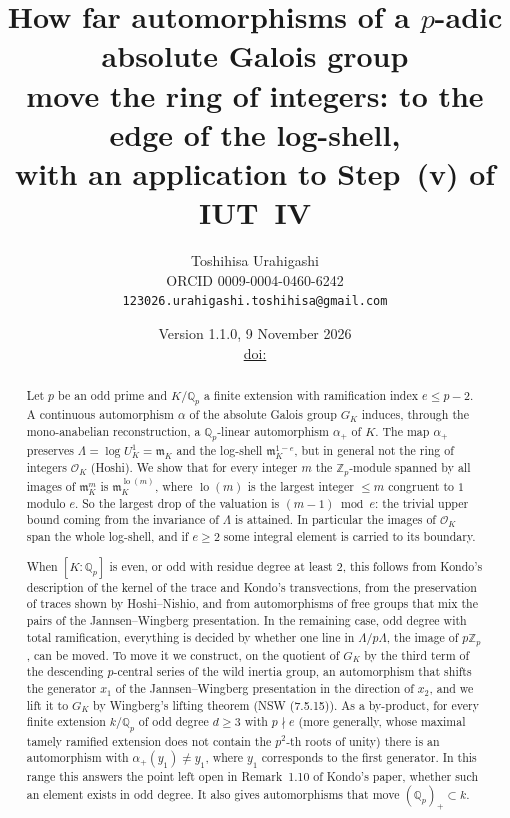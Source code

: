 \documentclass[11pt,a4paper]{article}
\title{How far automorphisms of a $p$-adic absolute Galois group\\ move the ring of integers: to the edge of the
log-shell,\\ with an application to Step~(v) of IUT~IV}
\author{Toshihisa Urahigashi\\\small ORCID 0009-0004-0460-6242\\\small\texttt{123026.urahigashi.toshihisa@gmail.com}}
\date{Version 1.1.0, 9 November 2026\\\small\href{https://doi.org/\thisdoi}{doi:\thisdoi}}
\newcommand{\Zp}{\mathbb{Z}_p}
\newcommand{\Qp}{\mathbb{Q}_p}
\newcommand{\cO}{\mathcal{O}}
\newcommand{\fm}{\mathfrak{m}}
\newcommand{\lo}{\operatorname{lo}}
\theoremstyle{plain}
\theoremstyle{definition}
\theoremstyle{remark}
\begin{document}
\maketitle

\begin{abstract}
Let $p$ be an odd prime and $K/\Qp$ a finite extension with ramification index $e\le p-2$. A continuous automorphism
$\alpha$ of the absolute Galois group $G_K$ induces, through the mono-anabelian reconstruction, a $\Qp$-linear
automorphism $\alpha_+$ of $K$. The map $\alpha_+$ preserves $\Lambda=\log U^1_K=\fm_K$ and the log-shell
$\fm_K^{1-e}$, but in general not the ring of integers $\cO_K$ (Hoshi). We show that for every integer $m$ the
$\Zp$-module spanned by all images of $\fm_K^m$ is $\fm_K^{\lo(m)}$, where $\lo(m)$ is the largest integer $\le m$
congruent to $1$ modulo $e$. So the largest drop of the valuation is $(m-1)\bmod e$: the trivial upper bound coming
from the invariance of $\Lambda$ is attained. In particular the images of $\cO_K$ span the whole log-shell, and if
$e\ge2$ some integral element is carried to its boundary.

When $[K:\Qp]$ is even, or odd with residue degree at least $2$, this follows from Kondo's description of the kernel
of the trace and Kondo's transvections, from the preservation of traces shown by Hoshi--Nishio, and from automorphisms of
free groups that mix the pairs of the Jannsen--Wingberg presentation. In the remaining case, odd degree with total
ramification, everything is decided by whether one line in $\Lambda/p\Lambda$, the image of $p\Zp$, can be moved. To
move it we construct, on the quotient of $G_K$ by the third term of the descending $p$-central series of the wild
inertia group, an automorphism that shifts the generator $x_1$ of the Jannsen--Wingberg presentation in the
direction of $x_2$, and we lift it to $G_K$ by Wingberg's lifting theorem (NSW (7.5.15)). As a by-product, for every
finite extension $k/\Qp$ of odd degree $d\ge3$ with $p\nmid e$ (more generally, whose maximal tamely ramified extension
does not contain the $p^2$-th roots of unity) there is an automorphism with $\alpha_+(y_1)\ne y_1$, where $y_1$
corresponds to the first generator. In this range this answers the point left open in Remark~1.10 of Kondo's paper,
whether such an element exists in odd degree. It also gives automorphisms that move $(\Qp)_+\subset k$.


\end{abstract}
\end{document}
